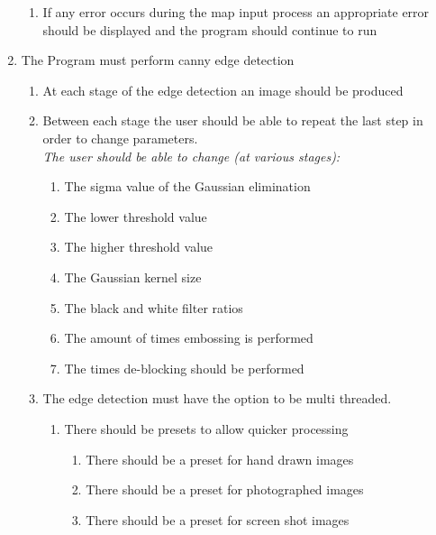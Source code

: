 \begin{flushleft}
\begin{enumerate}
\begin{enumerate}
                \item If any error occurs during the map input process an appropriate error should be displayed and the program should continue to run
            \end{enumerate}

            \item The Program must perform canny edge detection   
            \begin{enumerate}
                \item At each stage of the edge detection an image should be produced
                \begin{enumerate}
                \end{enumerate}
                \item Between each stage the user should be able to repeat the last step in order to change parameters.\\
                \emph{The user should be able to change (at various stages):} 
                \begin{enumerate}
                    \item The sigma value of the Gaussian elimination
                    \item The lower threshold value
                    \item The higher threshold value
                    \item The Gaussian kernel size
                    \item The black and white filter ratios
                    \item The amount of times embossing is performed
                    \item The times de-blocking should be performed
                \end{enumerate}
                \item The edge detection must have the option to be multi threaded.
                \begin{enumerate}
                    \item There should be presets to allow quicker processing
                    \begin{enumerate}
                        \item There should be a preset for hand drawn images
                        \item There should be a preset for photographed images
                        \item There should be a preset for screen shot images
                    \end{enumerate}
                \end{enumerate}
                

\end{enumerate}
\end{enumerate}
\end{flushleft}
